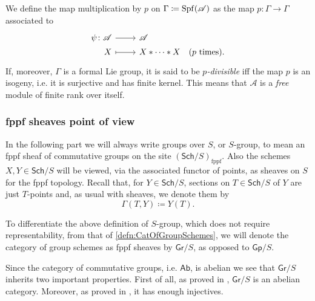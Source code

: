 \begin{defn}\label{defn:pDivisibleFormalLieGroup}
	We define the map multiplication by $p$ on $\Gamma \coloneqq \operatorname{Spf}(\mathscr{A})$
	as the map $p\colon \Gamma \to \Gamma$
	associated to 
	\begin{equation*}
	\begin{tikzcd}[row sep = 0ex
		,/tikz/column 1/.append style={anchor=base east}
		,/tikz/column 2/.append style={anchor=base west}]
		\psi\colon \mathscr{A} \arrow[r, "", rightarrow] &
		\mathscr{A} \\ %
		X \arrow[r, "", mapsto] & 
		X \ast \cdots \ast X
	\quad \text{($p$ times)}
	.\end{tikzcd}
	\end{equation*} 
	If, moreover, $\Gamma$ is a formal Lie group, 
	it is said to be \emph{$p$-divisible} iff the map $p$ is 
	an isogeny, i.e. it is surjective and has finite kernel.
	This means that $\mathscr{A}$ is a \emph{free} module of finite rank over itself.
\end{defn}



\subsubsection{fppf sheaves point of view}
In the following part we will always write groups over $S$, or $S$-group, to mean
an fppf sheaf of commutative groups on the site $(\mathsf{Sch}/S)_{\mathrm{fppf}}$.
Also the schemes $X, Y \in \mathsf{Sch}/S$ will be viewed, via the associated
functor of points, as sheaves on $S$ for the fppf topology.
Recall that, for $Y \in \mathsf{Sch}/S$, sections on
$T \in \mathsf{Sch}/S$ of $Y$ are just $T$-points and,
as usual with sheaves, we denote them by
\begin{equation*}
	\Gamma \left( T, Y \right) \coloneqq Y(T)
.\end{equation*}


\begin{ntt}[]\label{not:GrS} 
	To differentiate the above definition of $S$-group,
	which does not require representability, from that of \cref{defn:CatOfGroupSchemes}, we will
	denote the category of group schemes as fppf sheaves by $\mathsf{Gr}/S$,
	as opposed to $\mathsf{Gp}/S$.
\end{ntt}


\begin{rem}[]\label{rem:PropertiesGrS}
	Since the category of commutative groups, i.e. $\mathsf{Ab}$, is
	abelian we see that $\mathsf{Gr}/S$ inherits two important properties.
	First of all, as proved in 
	\cite[\href{https://stacks.math.columbia.edu/tag/03CN}{Lemma 03CN}]{SP},
	$\mathsf{Gr}/S$ is an abelian category.
	Moreover, as proved in 
	\cite[\href{https://stacks.math.columbia.edu/tag/01DP}{Theorem 01DP}]{SP},
	it has enough injectives.
\end{rem}


